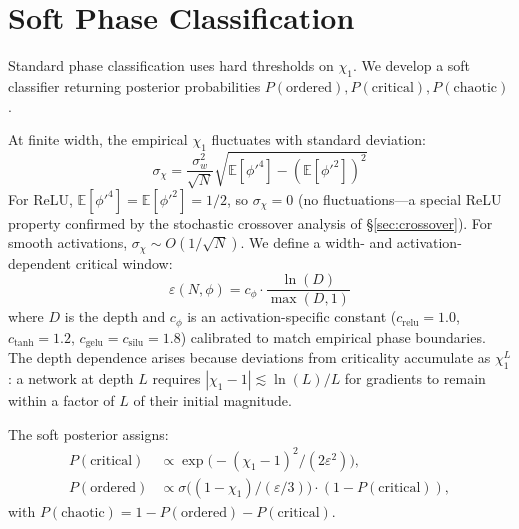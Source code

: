 \documentclass[10pt]{article}
\newcommand{\EE}{\mathbb{E}}
\begin{document}
\section{Soft Phase Classification}
\label{sec:calibrated}

Standard phase classification uses hard thresholds on $\chi_1$.
We develop a soft classifier returning posterior probabilities $P(\text{ordered}), P(\text{critical}), P(\text{chaotic})$.

At finite width, the empirical $\chi_1$ fluctuates with standard deviation:
\begin{equation}
    \sigma_\chi = \frac{\sigma_w^2}{\sqrt{N}}\sqrt{\EE[\phi'^4] - (\EE[\phi'^2])^2}
    \label{eq:chi1-fluctuation}
\end{equation}
For ReLU, $\EE[\phi'^4] = \EE[\phi'^2] = 1/2$, so $\sigma_\chi = 0$ (no fluctuations---a special ReLU property confirmed by the stochastic crossover analysis of \S\ref{sec:crossover}).
For smooth activations, $\sigma_\chi \sim O(1/\sqrt{N})$.
We define a width- and activation-dependent critical window:
\begin{equation}
    \varepsilon(N, \phi) = c_\phi \cdot \frac{\ln(D)}{\max(D,1)}
    \label{eq:critical-window}
\end{equation}
where $D$ is the depth and $c_\phi$ is an activation-specific constant ($c_{\text{relu}} = 1.0$, $c_{\text{tanh}} = 1.2$, $c_{\text{gelu}} = c_{\text{silu}} = 1.8$) calibrated to match empirical phase boundaries.
The depth dependence arises because deviations from criticality accumulate as $\chi_1^L$: a network at depth $L$ requires $|\chi_1 - 1| \lesssim \ln(L)/L$ for gradients to remain within a factor of $L$ of their initial magnitude.

The soft posterior assigns:
\begin{align}
    P(\text{critical}) &\propto \exp\!\bigl(-(\chi_1 - 1)^2/(2\varepsilon^2)\bigr), \label{eq:p-critical} \\
    P(\text{ordered}) &\propto \sigma\!\bigl((1 - \chi_1)/(\varepsilon/3)\bigr) \cdot (1 - P(\text{critical})), \label{eq:p-ordered}
\end{align}
with $P(\text{chaotic}) = 1 - P(\text{ordered}) - P(\text{critical})$.
\end{document}
